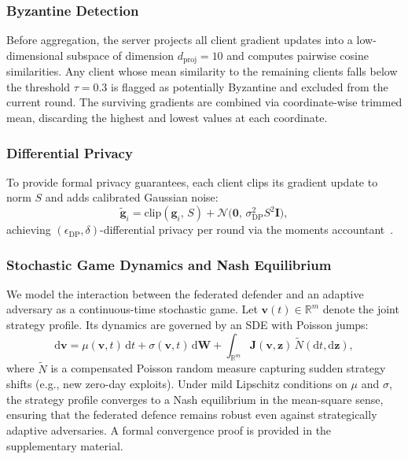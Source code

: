 \subsubsection{Byzantine Detection}
Before aggregation, the server projects all client gradient updates into
a low-dimensional subspace of dimension $d_{\mathrm{proj}}=10$ and
computes pairwise cosine similarities.  Any client whose mean similarity
to the remaining clients falls below the threshold $\tau=0.3$ is flagged
as potentially Byzantine and excluded from the current round.  The
surviving gradients are combined via coordinate-wise trimmed mean,
discarding the highest and lowest values at each coordinate.

\subsubsection{Differential Privacy}
To provide formal privacy guarantees, each client clips its gradient
update to norm $S$ and adds calibrated Gaussian noise:
\begin{equation}
  \tilde{\mathbf{g}}_i
  = \mathrm{clip}(\mathbf{g}_i,\,S)
    + \mathcal{N}\!\bigl(\mathbf{0},\,\sigma_{\mathrm{DP}}^2 S^2
    \mathbf{I}\bigr),
  \label{eq:dp}
\end{equation}
achieving $(\epsilon_{\mathrm{DP}},\delta)$-differential privacy per
round via the moments accountant~\cite{abadi2016deep}.

\subsubsection{Stochastic Game Dynamics and Nash Equilibrium}
We model the interaction between the federated defender and an adaptive
adversary as a continuous-time stochastic game.  Let
$\mathbf{v}(t)\in\mathbb{R}^{m}$ denote the joint strategy profile.
Its dynamics are governed by an SDE with Poisson jumps:
\begin{equation}
  \mathrm{d}\mathbf{v}
  = \mu(\mathbf{v},t)\,\mathrm{d}t
    + \sigma(\mathbf{v},t)\,\mathrm{d}\mathbf{W}
    + \int_{\mathbb{R}^m}\!\mathbf{J}(\mathbf{v},\mathbf{z})\,
      \widetilde{N}(\mathrm{d}t,\mathrm{d}\mathbf{z}),
  \label{eq:jump_sde}
\end{equation}
where $\widetilde{N}$ is a compensated Poisson random measure capturing
sudden strategy shifts (e.g., new zero-day exploits).  Under mild
Lipschitz conditions on $\mu$ and $\sigma$, the strategy profile
converges to a Nash equilibrium in the mean-square sense, ensuring that
the federated defence remains robust even against strategically adaptive
adversaries.  A formal convergence proof is provided in the
supplementary material.

